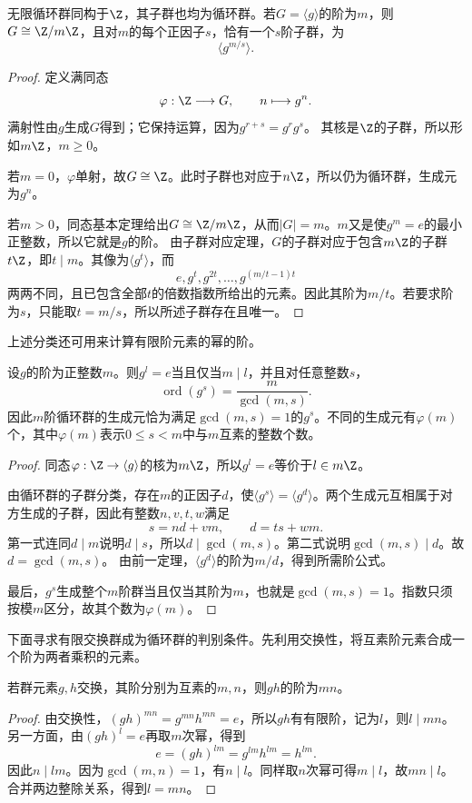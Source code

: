 \begin{theorem}
无限循环群同构于$\Z$，其子群也均为循环群。若$G=\langle g\rangle$的阶为$m$，则$G\cong\Z/m\Z$，且对$m$的每个正因子$s$，恰有一个$s$阶子群，为
\[
\langle g^{m/s}\rangle.
\]
\end{theorem}
\begin{proof}
定义满同态
\[
\varphi:\Z\longrightarrow G,\qquad n\longmapsto g^n.
\]
满射性由$g$生成$G$得到；它保持运算，因为$g^{r+s}=g^rg^s$。
其核是$\Z$的子群，所以形如$m\Z$，$m\geq0$。

若$m=0$，$\varphi$单射，故$G\cong\Z$。此时子群也对应于$n\Z$，所以仍为循环群，生成元为$g^n$。

若$m>0$，同态基本定理给出$G\cong\Z/m\Z$，从而$|G|=m$。$m$又是使$g^m=e$的最小正整数，所以它就是$g$的阶。
由子群对应定理，$G$的子群对应于包含$m\Z$的子群$t\Z$，即$t\mid m$。其像为$\langle g^t\rangle$，而
\[
e,g^t,g^{2t},\ldots,g^{(m/t-1)t}
\]
两两不同，且已包含全部$t$的倍数指数所给出的元素。因此其阶为$m/t$。若要求阶为$s$，只能取$t=m/s$，所以所述子群存在且唯一。
\end{proof}

上述分类还可用来计算有限阶元素的幂的阶。

\begin{proposition}
设$g$的阶为正整数$m$。则$g^l=e$当且仅当$m\mid l$，并且对任意整数$s$，
\[
\operatorname{ord}(g^s)=\frac{m}{\gcd(m,s)}.
\]
因此$m$阶循环群的生成元恰为满足$\gcd(m,s)=1$的$g^s$。不同的生成元有$\varphi(m)$个，其中$\varphi(m)$表示$0\leq s<m$中与$m$互素的整数个数。
\end{proposition}
\begin{proof}
同态$\varphi:\Z\to\langle g\rangle$的核为$m\Z$，所以$g^l=e$等价于$l\in m\Z$。

由循环群的子群分类，存在$m$的正因子$d$，使$\langle g^s\rangle=\langle g^d\rangle$。两个生成元互相属于对方生成的子群，因此有整数$n,v,t,w$满足
\[
s=nd+vm,\qquad d=ts+wm.
\]
第一式连同$d\mid m$说明$d\mid s$，所以$d\mid\gcd(m,s)$。第二式说明$\gcd(m,s)\mid d$。故$d=\gcd(m,s)$。
由前一定理，$\langle g^d\rangle$的阶为$m/d$，得到所需阶公式。

最后，$g^s$生成整个$m$阶群当且仅当其阶为$m$，也就是$\gcd(m,s)=1$。指数只须按模$m$区分，故其个数为$\varphi(m)$。
\end{proof}

下面寻求有限交换群成为循环群的判别条件。先利用交换性，将互素阶元素合成一个阶为两者乘积的元素。

\begin{lemma}
若群元素$g,h$交换，其阶分别为互素的$m,n$，则$gh$的阶为$mn$。
\end{lemma}
\begin{proof}
由交换性，$(gh)^{mn}=g^{mn}h^{mn}=e$，所以$gh$有有限阶，记为$l$，则$l\mid mn$。
另一方面，由$(gh)^l=e$再取$m$次幂，得到
\[
e=(gh)^{lm}=g^{lm}h^{lm}=h^{lm}.
\]
因此$n\mid lm$。因为$\gcd(m,n)=1$，有$n\mid l$。同样取$n$次幂可得$m\mid l$，故$mn\mid l$。合并两边整除关系，得到$l=mn$。
\end{proof}

